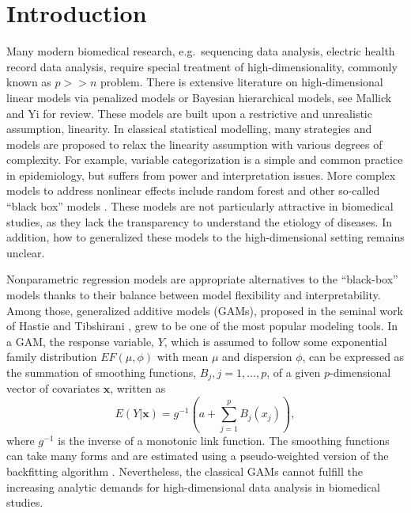 \documentclass[AMA,STIX1COL,]{WileyNJD-v2}
\begin{document}
\usetikzlibrary{shapes.geometric, arrows, positioning, calc, matrix, backgrounds, fit}
\newcommand{\bs}[1]{\boldsymbol{#1}}
\newcommand{\tp}{\text{pen}}

\hypertarget{introduction}{%
\section{Introduction}\label{introduction}}

\label{sec:intro}

Many modern biomedical research, e.g.~sequencing data analysis, electric
health record data analysis, require special treatment of
high-dimensionality, commonly known as \(p >> n\) problem. There is
extensive literature on high-dimensional linear models via penalized
models or Bayesian hierarchical models, see Mallick and Yi
\citep{Mallick2013} for review. These models are built upon a
restrictive and unrealistic assumption, linearity. In classical
statistical modelling, many strategies and models are proposed to relax
the linearity assumption with various degrees of complexity. For
example, variable categorization is a simple and common practice in
epidemiology, but suffers from power and interpretation issues. More
complex models to address nonlinear effects include random forest and
other so-called ``black box'' models \citep{Breiman2001}. These models
are not particularly attractive in biomedical studies, as they lack the
transparency to understand the etiology of diseases. In addition, how to
generalized these models to the high-dimensional setting remains
unclear.

Nonparametric regression models are appropriate alternatives to the
``black-box'' models thanks to their balance between model flexibility
and interpretability. Among those, generalized additive models (GAMs),
proposed in the seminal work of Hastie and Tibshirani
\citep{Hastie1987}, grew to be one of the most popular modeling tools.
In a GAM, the response variable, \(Y\), which is assumed to follow some
exponential family distribution \(EF(\mu, \phi)\) with mean \(\mu\) and
dispersion \(\phi\), can be expressed as the summation of smoothing
functions, \(B_j, j = 1, \dots, p\), of a given \(p\)-dimensional vector
of covariates \(\boldsymbol{x}\), written as \[
 E(Y|\boldsymbol{x}) = g^{-1}(a + \sum\limits^p_{j=1}B_j(x_j)),
\] where \(g^{-1}\) is the inverse of a monotonic link function. The
smoothing functions can take many forms and are estimated using a
pseudo-weighted version of the backfitting algorithm
\citep{Breiman1985}. Nevertheless, the classical GAMs cannot fulfill the
increasing analytic demands for high-dimensional data analysis in
biomedical studies.
\end{document}
